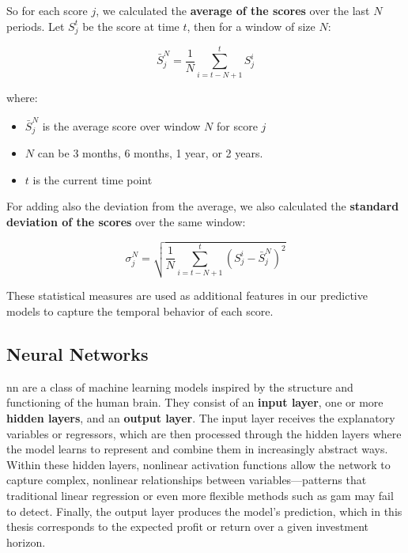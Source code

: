 \documentclass[11pt,english,a4paper,hidelinks]{book}
\begin{document}
\vspace{0.5cm}
\noindent So for each score \(j\), we calculated the \textbf{average of the scores} over the last \(N\) periods. Let \(S_j^t\) be the score at time \(t\), then for a window of size \(N\):

\begin{equation}
    \bar{S}_j^N = \frac{1}{N} \sum_{i=t-N+1}^{t} S_j^i
\end{equation}

\noindent where:
\begin{itemize}
    \item \(\bar{S}_j^N\) is the average score over window \(N\) for score \(j\)
    \item \(N\) can be 3 months, 6 months, 1 year, or 2 years.
    \item \(t\) is the current time point
\end{itemize}

\noindent For adding also the deviation from the average, we also calculated the \textbf{standard deviation of the scores} over the same window:

\begin{equation}
    \sigma_j^N = \sqrt{\frac{1}{N} \sum_{i=t-N+1}^{t} (S_j^i - \bar{S}_j^N)^2}
\end{equation}

\noindent These statistical measures are used as additional features in our predictive models to capture the temporal behavior of each score.

\subsection{Neural Networks}
\acrshort{nn} are a class of machine learning models inspired by the structure and functioning of the human brain. They consist of an \textbf{input layer}, one or more \textbf{hidden layers}, and an \textbf{output layer}. The input layer receives the explanatory variables or regressors, which are then processed through the hidden layers where the model learns to represent and combine them in increasingly abstract ways. Within these hidden layers, nonlinear activation functions allow the network to capture complex, nonlinear relationships between variables—patterns that traditional linear regression or even more flexible methods such as \acrshort{gam} may fail to detect. Finally, the output layer produces the model’s prediction, which in this thesis corresponds to the expected profit or return over a given investment horizon.
\end{document}
